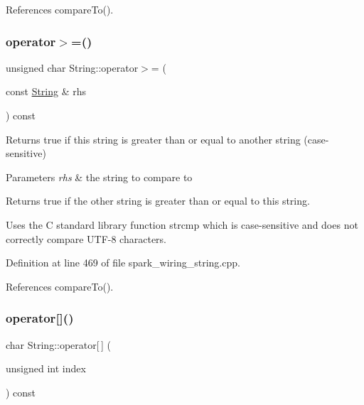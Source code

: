 References compare\+To().

\mbox{\label{class_string_ad55ec344221bba8a7447226bde7b00dc}} 
\subsubsection{\texorpdfstring{operator$>$=()}{operator>=()}}
{\footnotesize\ttfamily unsigned char String\+::operator$>$= (\begin{DoxyParamCaption}\item[{const \hyperlink{class_string}{String} \&}]{rhs }\end{DoxyParamCaption}) const}



Returns true if this string is greater than or equal to another string (case-\/sensitive) 


\begin{DoxyParams}{Parameters}
{\em rhs} & the string to compare to\\
\hline
\end{DoxyParams}
\begin{DoxyReturn}{Returns}
true if the other string is greater than or equal to this string.
\end{DoxyReturn}
Uses the C standard library function strcmp which is case-\/sensitive and does not correctly compare U\+T\+F-\/8 characters. 

Definition at line 469 of file spark\+\_\+wiring\+\_\+string.\+cpp.



References compare\+To().

\mbox{\label{class_string_a277d6b29f7f152a03c81700b12e43e55}} 
\subsubsection{\texorpdfstring{operator[]()}{operator[]()}\hspace{0.1cm}{\footnotesize\ttfamily [1/2]}}
{\footnotesize\ttfamily char String\+::operator\mbox{[}$\,$\mbox{]} (\begin{DoxyParamCaption}\item[{unsigned int}]{index }\end{DoxyParamCaption}) const}



